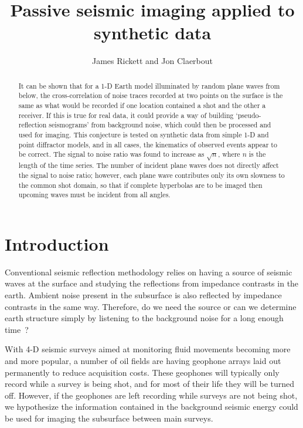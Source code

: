 
\title{Passive seismic imaging applied to synthetic data}


\author{James Rickett and Jon Claerbout}
\maketitle

\begin{abstract}
It can be shown that for a 1-D Earth model illuminated by random plane waves
from below, the cross-correlation of noise traces recorded at two points on the
surface is the same as what would be recorded if one location contained a
shot and the other a receiver. If this is true for real data, it could
provide a way of building `pseudo-reflection seismograms' from background
noise, which could then be processed and used for imaging.
This conjecture is tested on synthetic data from simple 
1-D and point diffractor models,
and in all cases, the kinematics of observed events 
appear to be correct. 
The signal to noise ratio was found to increase as $\sqrt{n}$, where $n$ is
the length of the time series. The number of incident 
plane waves does not directly affect the signal to noise ratio; however,
each plane wave contributes only its own slowness to the common 
shot domain, so that if complete hyperbolas are to be imaged 
then upcoming waves must be incident from all angles. 
\end{abstract}

\section{Introduction}
Conventional seismic reflection methodology relies on having a source
of seismic waves at the surface and studying the reflections from  
impedance contrasts in the earth. 
Ambient noise present in the subsurface is also reflected by impedance 
contrasts in the same way. Therefore, do we need the source or can we 
determine earth structure simply by listening to the 
background noise for a long enough time~?  

With 4-D seismic surveys aimed at monitoring fluid movements becoming more and 
more popular, a number of oil fields are having geophone arrays laid out 
permanently to reduce acquisition costs.  These geophones will 
typically only record while a survey is being shot, and for most of their 
life they will be turned off.  However, if the geophones are left recording 
while surveys are not being shot, we hypothesize the information 
contained in the background seismic energy could be used for imaging the 
subsurface between main surveys.

